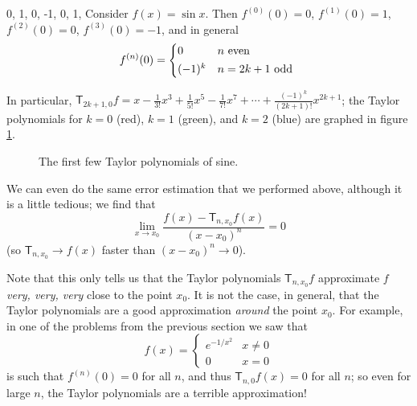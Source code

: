 \begin{ex}0, 1, 0, -1, 0, 1,
  Consider $ f(x) = \sin x $. Then $ f^{(0)}(0) = 0 $, $ f^{(1)}(0) = 1 $, $ f^{(2)}(0) = 0 $, $ f^{(3)}(0) = -1 $, and in general
  \begin{displaymath}
    f^{(n)}(0) = \begin{cases*}
                   0 & $ n $ even\\
                   (-1)^{k} & $ n = 2k + 1 $ odd
                 \end{cases*}
  \end{displaymath}

  In particular, $ \mathsf{T}_{2k + 1, 0} f = x - \frac{1}{3!} x^3 + \frac{1}{5!} x^5 - \frac{1}{7!} x^7 + \cdots + \frac{(-1)^k}{(2k + 1)!}x^{2k + 1} $;
  the Taylor polynomials for $ k = 0 $ (red), $ k = 1 $ (green), and $ k = 2 $ (blue) are graphed in figure \ref{fig:approx2}.
  \begin{figure}
    \centering
    \caption{The first few Taylor polynomials of sine.\label{fig:approx2}}
  \end{figure}
\end{ex}

We can even do the same error estimation that we performed above, although it is a little tedious; we
find that
\begin{equation}\label{eqn:tedious}
  \lim_{x \to x_0} \frac{f(x) - \mathsf{T}_{n, x_0} f(x)}{(x - x_0)^n} = 0
\end{equation}
(so $ \mathsf{T}_{n, x_0} \to f(x) $ faster than $ (x - x_0)^n \to 0 $).

Note that this only tells us that the Taylor polynomials $ \mathsf{T}_{n, x_0} f $ approximate $ f $ \emph{very, very, very} close to
the point $ x_0 $. It is not the case, in general, that the Taylor polynomials are a good approximation \emph{around} the point $ x_0 $.
For example, in one of the problems from the previous section we saw that
\begin{displaymath}
  f(x) = \begin{cases} e^{-1/x^2} & x \neq 0 \\ 0 &x = 0 \end{cases}
\end{displaymath}
is such that $ f^{(n)}(0) = 0 $ for all $ n $, and thus $ \mathsf{T}_{n, 0} f(x) = 0 $ for all $ n $; so even for large $ n $, the Taylor
polynomials are a terrible approximation!


